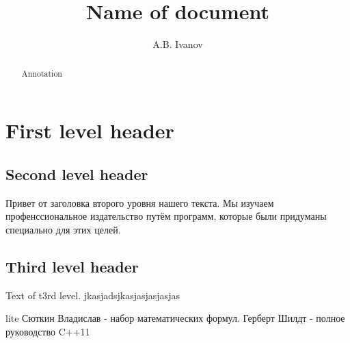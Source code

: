 \documentclass[12pt]{article}
\begin{document}
\title{Name of document}
\author{A.B. Ivanov}
\maketitle
\begin{abstract}
Annotation
\end{abstract}

\newpage
\pagestyle{plain}
\renewcommand{\@oddfoot}{\hfil WOW!\hfil} 

\section{First level header}
\subsection{Second level header}
		Привет от заголовка второго уровня нашего текста. Мы изучаем профенссиональное издательство путём программ, которые были придуманы специально для этих целей.
\subsection{Third level header}
	Text of t3rd level.
\newpage
jkasjadsjkasjasjasjasjas
\thispagestyle{plain}
\makeatletter
\renewcommand{\@oddhead}{\hfill  hello world! \hfill}
\renewcommand{\@oddfoot}{{my \hfill \thepage }}

\makeatother%


\newpage
\begin {thebibliography}
{lite}
 Сюткин Владислав - набор математических формул.
 Герберт Шилдт - полное руководство C++11
\end {thebibliography}
\end{document}
